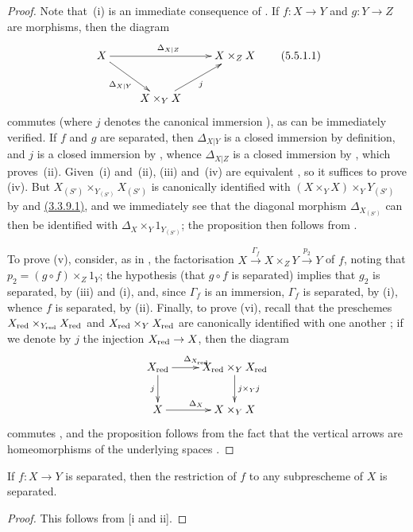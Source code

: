\begin{proof}
Note that~(i) is an immediate consequence of .
If $f:X\to Y$ and $g:Y\to Z$ are morphisms, then the diagram
\[
\label{I.5.5.1.1}
  \xymatrix{
    X\ar[rr]^{\Delta_{X|Z}}\ar[dr]_{\Delta_{X|Y}} & &
    X\times_Z X\\
    & X\times_Y X\ar[ur]_j
  }
  \tag{5.5.1.1}
\]
commutes (where $j$ denotes the canonical immersion ), as can be immediately verified.
If $f$ and $g$ are separated, then $\Delta_{X|Y}$ is a closed immersion by definition, and $j$ is a closed immersion by , whence $\Delta_{X|Z}$ is a closed immersion by , which
proves~(ii).
Given~(i) and~(ii), (iii) and~(iv) are equivalent , so it suffices to prove (iv).
But $X_{(S')}\times_{Y_{(S')}}X_{(S')}$ is canonically identified with $(X\times_Y X)\times_Y Y_{(S')}$ by  and \hyperref[1.3.3.9]{(3.3.9.1)}, and we immediately see that the diagonal morphism $\Delta_{X_{(S')}}$ can then be identified with $\Delta_X\times_Y 1_{Y_{(S')}}$;
the proposition then follows from .

To prove (v), consider, as in , the factorisation $X\xrightarrow{\Gamma_f}X\times_Z Y\xrightarrow{p_2}Y$ of $f$, noting that $p_2=(g\circ f)\times_Z 1_Y$;
the hypothesis (that $g\circ f$ is separated) implies that $g_2$ is separated, by (iii) and (i), and, since $\Gamma_f$ is an immersion, $\Gamma_f$ is separated, by (i), whence $f$ is separated, by (ii).
Finally, to prove (vi), recall that the preschemes $X_{\mathrm{red}}\times_{Y_{\mathrm{red}}}X_{\mathrm{red}}$ and $X_{\mathrm{red}}\times_Y X_{\mathrm{red}}$ are canonically identified with one another ;
if we denote by $j$ the injection $X_\red\to X$, then the diagram
\[
  \xymatrix{
    X_\red\ar[r]^{\Delta_{X_\red}}\ar[d]_j &
    X_\red\times_Y X_\red\ar[d]^{j\times_Y j}\\
    X\ar[r]^{\Delta_X} &
    X\times_Y X
  }
\]
commutes , and the proposition follows from the fact that the vertical arrows are homeomorphisms of the underlying spaces .
\end{proof}

\begin{corollary}[5.5.2]
\label{I.5.5.2}
If $f:X\to Y$ is separated, then the restriction of $f$ to any subprescheme of $X$ is separated.
\end{corollary}

\begin{proof}
This follows from [i and ii].
\end{proof}

